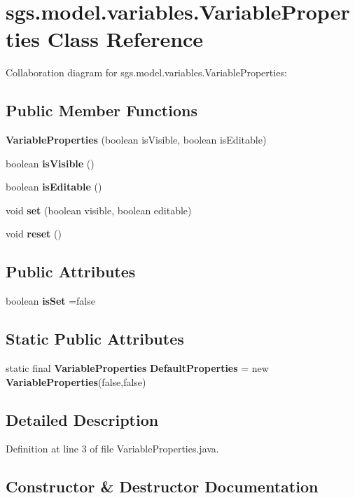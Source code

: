 \section{sgs.\-model.\-variables.\-Variable\-Properties Class Reference}
\label{classsgs_1_1model_1_1variables_1_1_variable_properties}


Collaboration diagram for sgs.\-model.\-variables.\-Variable\-Properties\-:
\subsection*{Public Member Functions}
\begin{DoxyCompactItemize}
\item 
{\bf Variable\-Properties} (boolean is\-Visible, boolean is\-Editable)
\item 
boolean {\bf is\-Visible} ()
\item 
boolean {\bf is\-Editable} ()
\item 
void {\bf set} (boolean visible, boolean editable)
\item 
void {\bf reset} ()
\end{DoxyCompactItemize}
\subsection*{Public Attributes}
\begin{DoxyCompactItemize}
\item 
boolean {\bf is\-Set} =false
\end{DoxyCompactItemize}
\subsection*{Static Public Attributes}
\begin{DoxyCompactItemize}
\item 
static final {\bf Variable\-Properties} {\bf Default\-Properties} = new {\bf Variable\-Properties}(false,false)
\end{DoxyCompactItemize}


\subsection{Detailed Description}


Definition at line 3 of file Variable\-Properties.\-java.



\subsection{Constructor \& Destructor Documentation}
